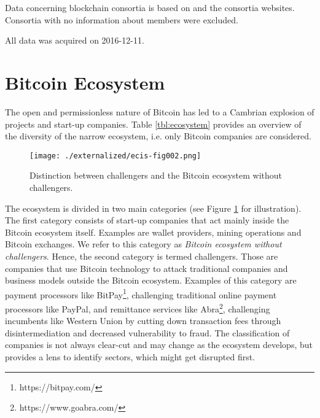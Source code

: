 Data concerning blockchain consortia is based on \parencite{Mougayar2016} and the consortia websites. Consortia with no information about members were excluded.

All data was acquired on 2016-12-11.

\section{Bitcoin Ecosystem}

\label{sec:sec:eco}

The open and permissionless nature of Bitcoin has led to a Cambrian explosion of 
projects and start-up companies. Table \ref{tbl:ecosystem} provides an overview of the diversity 
of the narrow ecosystem, i.e. only Bitcoin companies are considered. 

\begin{figure}[htbp]
\centering
\texttt{[image: ./externalized/ecis-fig002.png]}
\caption{Distinction between challengers and the Bitcoin ecosystem without 
challengers.}
\label{fig:challengers}
\end{figure}

The ecosystem is divided in two main categories (see Figure \ref{fig:challengers} for illustration). 
The first category consists of start-up companies that act mainly inside the Bitcoin 
ecosystem itself. Examples are wallet providers, mining operations and Bitcoin 
exchanges. We refer to this category as \emph{Bitcoin ecosystem without challengers}. 
Hence, the second category is termed challengers. Those are companies that use 
Bitcoin technology to attack traditional companies and business models outside 
the Bitcoin ecosystem. Examples of this category are payment processors like BitPay\footnote{https://bitpay.com/}, challenging traditional online payment processors like PayPal, and remittance 
services like Abra\footnote{https://www.goabra.com/}, challenging incumbents like Western Union by cutting 
down transaction fees through disintermediation and decreased vulnerability to 
fraud. The classification of companies is not always clear-cut and may change as 
the ecosystem develops, but provides a lens to identify sectors, which might get 
disrupted first.


